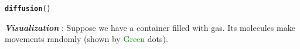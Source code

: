 \documentclass[11pt, a4paper]{article}\usepackage[]{graphicx}\usepackage[]{xcolor}
\makeatletter
\newcommand{\hldef}[1]{\textcolor[rgb]{0.345,0.345,0.345}{#1}}%
\newcommand{\hlkwd}[1]{\textcolor[rgb]{0.737,0.353,0.396}{\textbf{#1}}}%
\newenvironment{kframe}{%
 \def\at@end@of@kframe{}%
 \ifinner\ifhmode%
  \def\at@end@of@kframe{\end{minipage}}%
  \begin{minipage}{\columnwidth}%
 \fi\fi%
 \def\FrameCommand##1{\hskip\@totalleftmargin \hskip-\fboxsep
 \colorbox{shadecolor}{##1}\hskip-\fboxsep
     \hskip-\linewidth \hskip-\@totalleftmargin \hskip\columnwidth}%
 \MakeFramed {\advance\hsize-\width
   \@totalleftmargin\z@ \linewidth\hsize
   \@setminipage}}%
 {\par\unskip\endMakeFramed%
 \at@end@of@kframe}
\newenvironment{knitrout}{}{} %
\makeatother
\begin{document}
\begin{knitrout}
\color{fgcolor}\begin{kframe}
\begin{alltt}
\hlkwd{diffusion}\hldef{()}
\end{alltt}
\end{kframe}
\end{knitrout}



\faArrowAltCircleRight[regular] \textcolor{col1}{\textbf{\textit{Visualization}}} : Suppose we have a container filled with gas. Its molecules make movements randomly (shown by \textcolor{green}{Green} dots).

\begin{table}[!htbp]

\begin{center}
\begin{tabular}{ccc}


\end{tabular}
\end{center}
\end{table}
\end{document}
